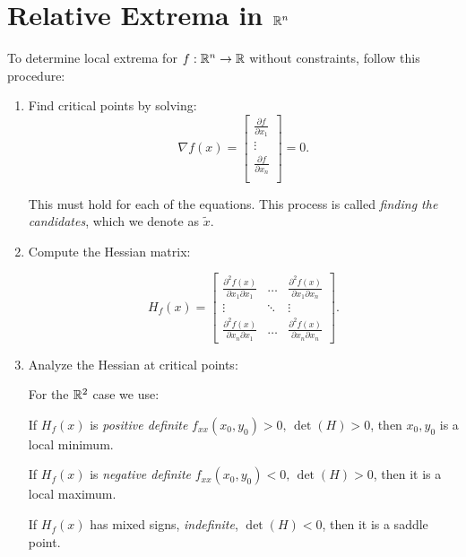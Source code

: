 \section{Relative Extrema in \texorpdfstring{\(\mathbb{R}^n\)}{}}

To determine local extrema for \( f : \mathbb{R}^n \to \mathbb{R} \) without constraints, follow this procedure:

\begin{enumerate}

    \item Find critical points by solving:
        \[
            \nabla f(x) = 
            \begin{bmatrix}
                \frac{\partial f}{\partial x_1} \\ 
                \vdots \\ 
                \frac{\partial f}{\partial x_n} \\ 
            \end{bmatrix} 
            = 0.
        \]

        This must hold for each of the equations. This process is called \emph{finding the candidates}, which we denote as \(\tilde{x}\).

    \item Compute the Hessian matrix:

    \[
            H_f(x) = 
            \begin{bmatrix}
                \frac{\partial^2 f(x)}{\partial x_1 \partial x_1} & \dots & \frac{\partial^2 f(x)}{\partial x_1 \partial x_n} \\ 
                \vdots & \ddots & \vdots \\ 
                \frac{\partial^2 f(x)}{\partial x_n \partial x_1} & \dots & \frac{\partial^2 f(x)}{\partial x_n \partial x_n}
            \end{bmatrix}.
    \]

    \item  Analyze the Hessian at critical points:

        For the \(\mathbb{R}^2\) case we use:

        \subitem If \( H_f(x)\) is \emph{positive definite} \(f_{xx}(x_0, y_0) > 0,\, \det(H) > 0\), then \(x_0, y_0\) is a local minimum.

        \subitem If \( H_f(x)\) is \emph{negative definite} \(f_{xx}(x_0, y_0) < 0,\, \det(H) > 0 \), then it is a local maximum.

        \subitem If \( H_f(x) \) has mixed signs, \emph{indefinite}, \(\det(H) < 0\), then it is  a saddle point.


\end{enumerate}
